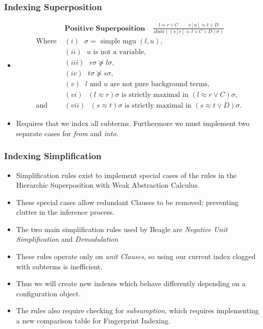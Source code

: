 \documentclass[10pt,xcolor={dvipsnames}]{beamer}
\newcommand{\HSWAC}{Hierarchic Superposition with Weak Abstraction Calculus}
\begin{document}
\begin{NoHyper}
\begin{frame}
  \frametitle{Indexing Superposition}
  \begin{itemize}
  \item<1->[]
  \begin{align*}
&\textbf{Positive Superposition}\ \ \ \ \  \frac{l \approx r \lor C\quad \quad s[u] \approx t \lor D}{\text{abstr}((s[r] \approx t \lor C \lor D)\sigma)}\\
\text{Where } &(i) \text{ $\sigma = $ simple mgu $(l,u)$,}\\
&(ii) \text{ $u$ is not a variable,}\\
&(iii) \text{ $r\sigma \not\succeq l\sigma$,}\\
&(iv) \text{ $t\sigma \not\succeq s\sigma$,}\\
&(v) \text{ $l$ and $u$ are not pure background terms,}\\
&(vi) \text{ $(l \approx r)\sigma$ is strictly maximal in $(l \approx r \lor C)\sigma$,}\\
\text{and } &(vii) \text{ $(s \approx t)\sigma$ is strictly maximal in $(s \approx t \lor D)\sigma$.}
\end{align*}
  \item<1-> Requires that we index all subterms. Furthermore we must implement two
  separate cases for \emph{from} and \emph{into}.

  \end{itemize}
\end{frame}

\begin{frame}
  \frametitle{Indexing Simplification}
  \begin{itemize}
  \item<1-> Simplification rules exist to implement special cases of the rules
  in the \HSWAC.
  \item<1-> These special cases allow redundant Clauses to be removed; preventing
  clutter in the inference process.
  \item<2-> The two main simplification rules used by Beagle are \emph{Negative Unit Simplification}
  and \emph{Demodulation}
  \item<3-> These rules operate only on \emph{unit Clauses}, so using our current
  index clogged with subterms is inefficient.
  \item<3-> Thus we will create new indexes which behave differently depending on a
  configuration object.
  \item<4-> The rules also require checking for \emph{subsumption}, which requires 
  implementing a new comparison table for Fingerprint Indexing.
  \end{itemize}
\end{frame}


\end{NoHyper}
\end{document}
